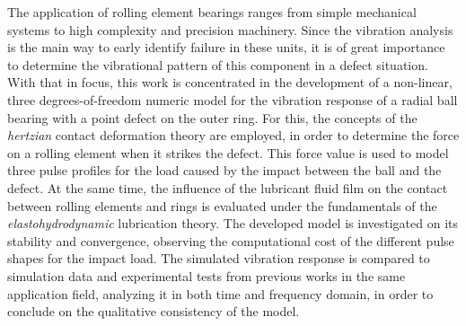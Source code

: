 The application of rolling element bearings ranges from simple mechanical systems to high complexity and precision machinery.
Since the vibration analysis is the main way to early identify failure in these units, it is of great importance to determine the vibrational pattern of this component in a defect situation.
With that in focus, this work is concentrated in the development of a non-linear, three degrees-of-freedom numeric model for the vibration response of a radial ball bearing with a point defect on the outer ring.
For this, the concepts of the \emph{hertzian} contact deformation theory are employed, in order to determine the force on a rolling element when it strikes the defect.
This force value is used to model three pulse profiles for the load caused by the impact between the ball and the defect.
At the same time, the influence of the lubricant fluid film on the contact between rolling elements and rings is evaluated under the fundamentals of the \emph{elastohydrodynamic} lubrication theory.
The developed model is investigated on its stability and convergence, observing the computational cost of the different pulse shapes for the impact load.
The simulated vibration response is compared to simulation data and experimental tests from previous works in the same application field, analyzing it in both time and frequency domain, in order to conclude on the qualitative consistency of the model.
\vspace{\onelineskip}

\imprimirpalavraschave
